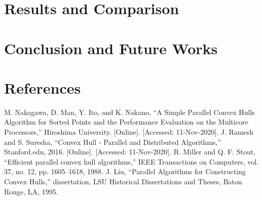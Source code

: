 \documentclass[conference]{IEEEtran}
\begin{document}
\section{Results and Comparison}

\section{Conclusion and Future Works}

\section{References}
\begin{thebibliography}{00}
 M. Nakagawa, D. Man, Y. Ito, and K. Nakano, “A Simple Parallel Convex Hulls Algorithm for Sorted Points and the Performance Evaluation on the Multicore Processors,” Hiroshima University. [Online]. [Accessed: 11-Nov-2020].
 J. Ramesh and S. Suresha, “Convex Hull - Parallel and Distributed Algorithms,” Stanford.edu,
2016. [Online]. [Accessed: 11-Nov-2020].
 R. Miller and Q. F. Stout, “Efficient parallel convex hull algorithms,” IEEE Transactions on Computers, vol. 37, no. 12, pp. 1605–1618, 1988.
 J. Liu, “Parallel Algorithms for Constructing Convex Hulls,” dissertation, LSU Historical Dissertations and Theses, Baton Rouge, LA, 1995.
\end{thebibliography}
\end{document}
